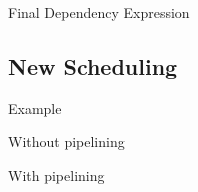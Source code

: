 \documentclass[notes xcolor=dvipsnames]{beamer}
\begin{document}
    \begin{frame}{Final Dependency Expression}

        \begin{figure}
        \end{figure}
        
    \end{frame}
    
    \subsection{New Scheduling}
    \begin{frame}{Example}

        Without pipelining
        \begin{figure}
        \end{figure}
             
        With pipelining
        \begin{figure}
        \end{figure}     
        
    \end{frame}
\end{document}
